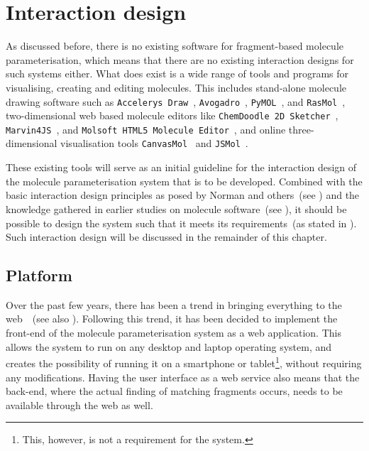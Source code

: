 \chapter{Interaction design}

As discussed before, there is no existing software for fragment-based molecule parameterisation, which means that there are no existing interaction designs for such systems either. What does exist is a wide range of tools and programs for visualising, creating and editing molecules. This includes stand-alone molecule drawing software such as \verb|Accelerys Draw|~\cite{accelrys2012accelrys}, \verb|Avogadro|~\cite{hanwell2012avogadro}, \verb|PyMOL|~\cite{delano2002pymol}, and \verb|RasMol|~\cite{pembroke2000bio}, two-dimensional web based molecule editors like \verb|ChemDoodle 2D Sketcher|~\cite{ichemlabs2013chemdoodle}, \verb|Marvin4JS|~\cite{chemxon2013marvin}, and \verb|Molsoft HTML5 Molecule Editor|~\cite{molsoft2012molsoft}, and online three-dimensional visualisation tools \verb|CanvasMol|~\cite{altered2013canvasmol} and \verb|JSMol|~\cite{hanson2013jsmol}.

These existing tools will serve as an initial guideline for the interaction design of the molecule parameterisation system that is to be developed. Combined with the basic interaction design principles as posed by Norman and others~(see ) and the knowledge gathered in earlier studies on molecule software~(see ), it should be possible to design the system such that it meets its requirements~(as stated in ). Such interaction design will be discussed in the remainder of this chapter.



\section{Platform}
Over the past few years, there has been a trend in bringing everything to the web~\cite{ertl2010molecular}~(see also ). Following this trend, it has been decided to implement the front-end of the molecule parameterisation system as a web application. This allows the system to run on any desktop and laptop operating system, and creates the possibility of running it on a smartphone or tablet\footnote{This, however, is not a requirement for the system.}, without requiring any modifications. Having the user interface as a web service also means that the back-end, where the actual finding of matching fragments occurs, needs to be available through the web as well.



